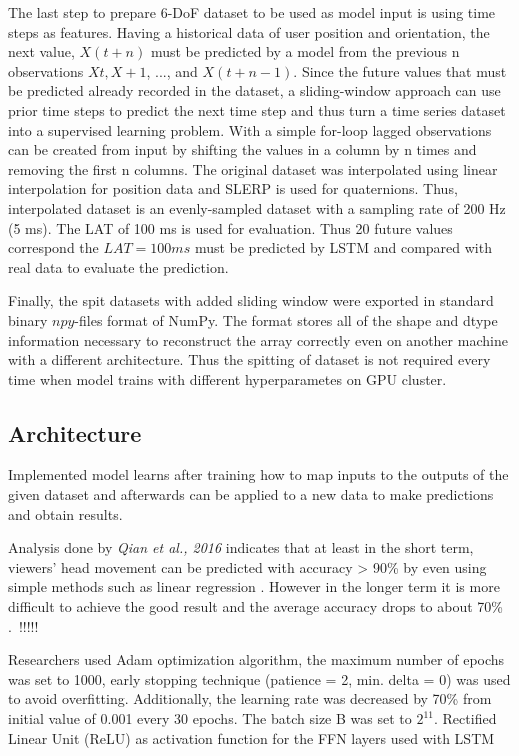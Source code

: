 The last step to prepare 6-DoF dataset to be used as model input is using time steps as features. Having a historical data of user position and orientation, the next value, $X(t+n)$ must be predicted by a model from the previous n observations $Xt, X+1$, ..., and $X(t+n-1)$. Since the future values that must be predicted already recorded in the dataset, a sliding-window approach can use prior time steps to predict the next time step and thus turn a time series dataset into a supervised learning problem. With a simple for-loop lagged observations can be created from input by shifting the values in a column by n times and removing the first n columns. The original dataset was interpolated using linear interpolation for position data and SLERP is used for quaternions. Thus, interpolated dataset is an evenly-sampled dataset with a sampling rate of 200 Hz (5 ms). The LAT of 100 ms is used for evaluation. Thus 20 future values correspond the $LAT = 100 ms$ must be predicted by LSTM and compared with real data to evaluate the prediction. 

Finally, the spit datasets with added sliding window were exported in standard binary $npy$-files format of NumPy. The format stores all of the shape and dtype information necessary to reconstruct the array correctly even on another machine with a different architecture. Thus the spitting of dataset is not required every time when model trains with different hyperparametes on GPU cluster.


\subsection{Architecture}
Implemented model learns after training how to map inputs to the outputs of the given dataset and afterwards can be applied to a new data to make predictions and obtain results.

Analysis done by \textit{Qian et al., 2016} indicates that at least in the short term, viewers’ head movement can be predicted with accuracy > 90\% by even using simple methods such as linear regression \cite{cellular_opt}. However in the longer term it is more difficult to achieve the good result and the average accuracy drops to about 70\% \cite{cellular_opt}.\
!!!!!

Researchers used Adam optimization algorithm, the maximum number of epochs was set to 1000, early stopping technique (patience = 2, min. delta = 0) was used to avoid overfitting. Additionally, the learning rate was decreased by 70\% from initial value of 0.001 every 30 epochs. The batch size B was set to $2^{11}$. Rectified Linear Unit (ReLU) as activation function for the FFN layers used with LSTM

